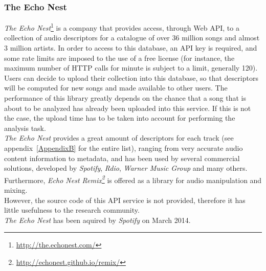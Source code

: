\subsubsection*{The Echo Nest}
\textit{The Echo Nest}\footnote{\url{http://the.echonest.com/}} is a company that provides access, through Web API, to a collection of audio descriptors for a catalogue of over 36 million songs and almost 3 million artists. In order to access to this database, an API key is required, and some rate limits are imposed to the use of a free license (for instance, the maximum number of HTTP calls for minute is subject to a limit, generally 120). Users can decide to upload their collection into this database, so that descriptors will be computed for new songs and made available to other users. The performance of this library greatly depends on the chance that a song that is about to be analyzed has already been uploaded into this service. If this is not the case, the upload time has to be taken into account for performing the analysis task. \\ 
\textit{The Echo Nest} provides a great amount of descriptors for each track (see appendix~\ref{AppendixB} for the entire list), ranging from very accurate audio content information to metadata, and has been used by several commercial solutions, developed by \textit{Spotify}, \textit{Rdio}, \textit{Warner Music Group} and many others. Furthermore, \textit{Echo Nest Remix\footnote{\url{http://echonest.github.io/remix/}}} is offered as a library for audio manipulation and mixing. \\
However, the source code of this API service is not provided, therefore it has little usefulness to the research community. \\ \textit{The Echo Nest} has been aquired by \textit{Spotify} on March 2014.


